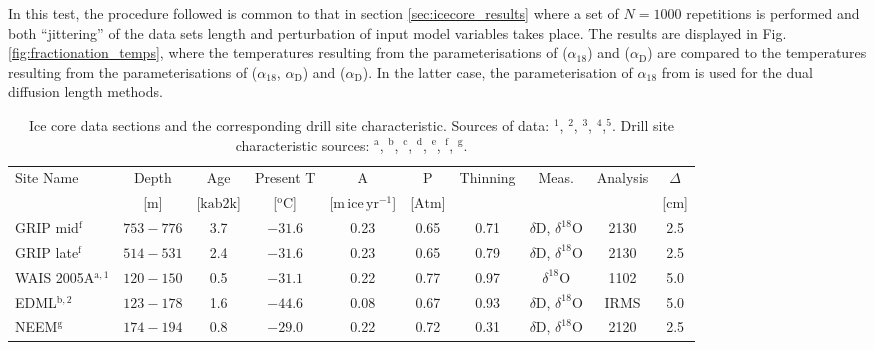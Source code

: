 \documentclass[11pt, draftcls, onecolumn]{IEEEtran} %
\numberwithin{equation}{section}
\numberwithin{table}{section}
\numberwithin{figure}{section}
\begin{document}
In this test, the procedure followed is common to that in section \ref{sec:icecore_results} where a set of $N = 1000$ repetitions is performed
and both ``jittering'' of the data sets length and perturbation of input model variables takes place.
The results are displayed in Fig. \ref{fig:fractionation_temps}, where the temperatures resulting from the parameterisations of
\cite{Majoube1971} ($\alpha_{18}$) and \cite{Merlivat1967} ($\alpha_\mathrm{D}$) are compared to the temperatures resulting from the parameterisations 
of \cite{Ellehoj2013} ($\alpha_{18}$, $\alpha_\mathrm{D}$) and \cite{Lamb2015} ($\alpha_\mathrm{D}$).
In the latter case, the parameterisation of $\alpha_{18}$ from \cite{Majoube1971} is used for the dual diffusion length methods.

\begin{table}
	\center
	\caption{Ice core data sections and the corresponding drill site characteristic. Sources of data: \citep{Steig2013}$^\mathrm{1}$, 
		\citep{Oerter2004}$^\mathrm{2}$, \citep{Svensson2015}$^\mathrm{3}$, \citep{Gkinis2011b}$^\mathrm{4}$,\citep{Gkinis2011}$^\mathrm{5}$. Drill site characteristic sources:		
		\citep{Bantaetal2008}$^\mathrm{a}$, \citep{Oerter2004,Veres2013}$^\mathrm{b}$, \citep{Watanabeetal2003,Kawamuraetal2003}$^\mathrm{c}$,
		\citep{Lorius1979}$^\mathrm{d}$, \citep{NGRIPmembers2004,Gkinis2014}$^\mathrm{e}$, \citep{Johnsen2000}$^\mathrm{f}$, \citep{Guillevic2013,Rasmussen2013}$^\mathrm{g}$.
	}\label{tbl:drill_sites}
	\begin{tabular}{l c c c c c c c c c} 
		\toprule
		Site Name &Depth & Age  & Present T  &
		A & P & Thinning& Meas. & Analysis&$\Delta$\\
		&[$\mathrm{m}$]&[$\mathrm{ka b2k}$]&[$^\mathrm{o}\mathrm{C}$]& [$\mathrm{m \, ice \, yr^{-1}}$]&
		[$\mathrm{Atm}$]& & &&[$\mathrm{cm}$]\\
		\midrule
		GRIP mid$^\mathrm{f}$&$753-776$ & 3.7 &$-31.6 $ & 0.23 & 0.65 & 0.71&$\delta$D, $\delta^{18}$O&2130&2.5\\
		GRIP late$^\mathrm{f}$&$514-531$  &2.4 &$-31.6 $ &0.23 & 0.65  &  0.79&$\delta$D, $\delta^{18}$O&2130&2.5\\	
		WAIS 2005A$^\mathrm{a,1}$ &$120-150$  & 0.5 & $-31.1$ &0.22 & 0.77 & 0.97 &  	 $\delta^{18}$O&1102&5.0\\
		EDML$^\mathrm{b,2}$ & $123-178$&1.6&$-44.6$ & 0.08 & 0.67 & 0.93&$\delta$D, $\delta^{18}$O&IRMS&5.0\\		
		NEEM$^\mathrm{g}$&$174-194 $&0.8 &$-29.0$ & 0.22 &  0.72 &  0.31&$\delta$D, $\delta^{18}$O&2120&2.5\\       

\end{tabular}
\end{table}
\end{document}
